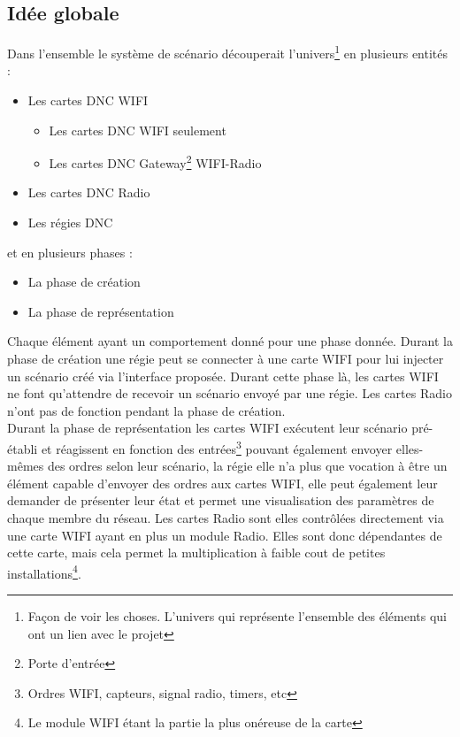 \subsection{Idée globale}
Dans l'ensemble le système de scénario découperait l'univers\footnote{Façon de voir les choses. L'univers qui représente l'ensemble des éléments qui ont un lien avec le projet} en plusieurs entités :
\begin{itemize}
\item Les cartes DNC WIFI
	\begin{itemize}
	\item Les cartes DNC WIFI seulement
	\item Les cartes DNC Gateway\footnote{Porte d'entrée} WIFI-Radio
	\end{itemize}
\item Les cartes DNC Radio
\item Les régies DNC
\end{itemize}
et en plusieurs phases :
\begin{itemize}
\item La phase de création
\item La phase de représentation
\end{itemize}
Chaque élément ayant un comportement donné pour une phase donnée.\p
Durant la phase de création une régie peut se connecter à une carte WIFI pour lui injecter un scénario créé via l'interface proposée. Durant cette phase là, les cartes WIFI ne font qu'attendre de recevoir un scénario envoyé par une régie. Les cartes Radio n'ont pas de fonction pendant la phase de création.\\
Durant la phase de représentation les cartes WIFI exécutent leur scénario pré-établi et réagissent en fonction des entrées\footnote{Ordres WIFI, capteurs, signal radio, timers, etc} pouvant également envoyer elles-mêmes des ordres selon leur scénario, la régie elle n'a plus que vocation à être un élément capable d'envoyer des ordres aux cartes WIFI, elle peut également leur demander de présenter leur état et permet une visualisation des paramètres de chaque membre du réseau. Les cartes Radio sont elles contrôlées directement via une carte WIFI ayant en plus un module Radio. Elles sont donc dépendantes de cette carte, mais cela permet la multiplication à faible cout de petites installations\footnote{Le module WIFI étant la partie la plus onéreuse de la carte}.

